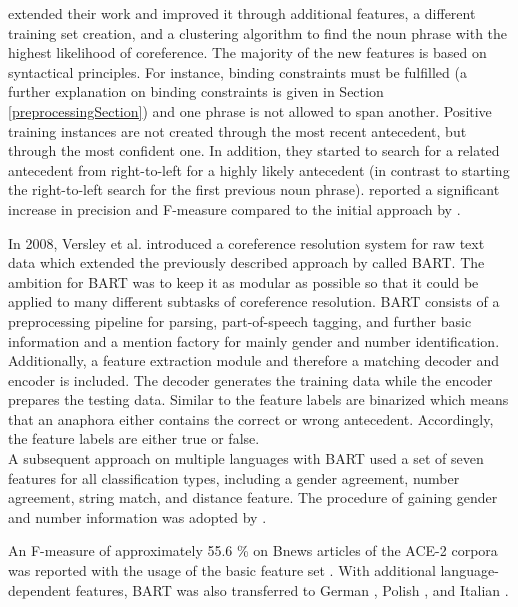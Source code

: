 \cite{ng2002improving} extended their work and improved it through additional features, a different training set creation, and a clustering algorithm to find the noun phrase with the highest likelihood of coreference. The majority of the new features is based on syntactical principles. For instance, binding constraints must be fulfilled (a further explanation on binding constraints is given in Section \ref{preprocessingSection}) and one phrase is not allowed to span another. Positive training instances are not created through the most recent antecedent, but through the most confident one. In addition, they started to search for a related antecedent from right-to-left for a highly likely antecedent (in contrast to starting the right-to-left search for the first previous noun phrase). \cite{ng2002improving} reported a significant increase in precision and F-measure compared to the initial approach by \cite{soon2001machine}.

In 2008, Versley et al. introduced a coreference resolution system for raw text data which extended the previously described approach by \cite{soon2001machine} called BART. The ambition for BART was to keep it as modular as possible so that it could be applied to many different subtasks of coreference resolution. BART consists of a preprocessing pipeline for parsing, part-of-speech tagging, and further basic information and a mention factory for mainly gender and number identification. Additionally, a feature extraction module and therefore a matching decoder and encoder is included. The decoder generates the training data while the encoder prepares the testing data. Similar to \citep{soon2001machine} the feature labels are binarized which means that an anaphora either contains the correct or wrong antecedent. Accordingly, the feature labels are either true or false. \\
A subsequent approach on multiple languages with BART \citep{broscheit2010bart} used a set of seven features for all classification types, including a gender agreement, number agreement, string match, and distance feature. The procedure of gaining gender and number information was adopted by \cite{soon2001machine}. 

An F-measure of approximately 55.6 \% on Bnews articles of the ACE-2 corpora was reported with the usage of the basic feature set \citep{versley2008bart}. 
With additional language-dependent features, BART was also transferred to German \citep{broscheit2010extending}, Polish \citep{kopec2012creating}, and Italian \citep{poesio2010creating}.

